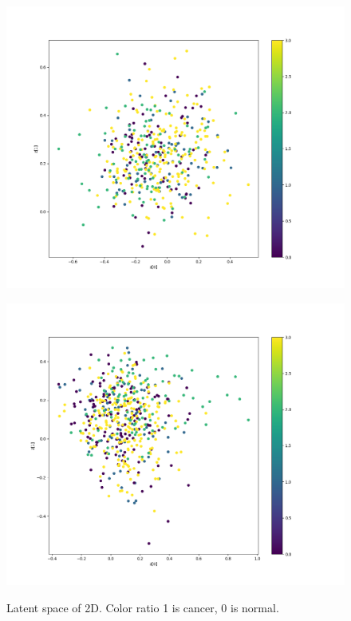 \begin{figure}[H]
\begin{minipage}[b]{0.45\columnwidth}
		\label{fig:}
	\end{minipage}
	\begin{minipage}[b]{0.45\columnwidth}
		\centering
		\includegraphics[clip, width=\linewidth]{fig/variational_auto_encoder/vae_colon_epoch_100_he_mix}
		\label{fig:}
	\end{minipage}
	\begin{minipage}[b]{0.45\columnwidth}
		\centering
		\includegraphics[clip, width=\linewidth]{fig/variational_auto_encoder/vae_colon_epoch_100_rgb_mix}
		\label{fig:}
	\end{minipage}
	
	\caption{Latent space of 2D. Color ratio 1 is cancer, 0 is normal.}
	\label{fig:VAEplot}
		
\end{figure}

